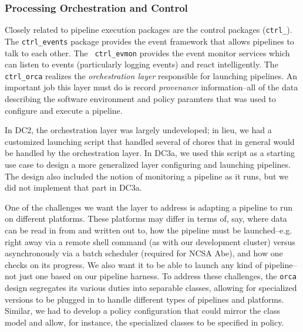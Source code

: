 
\subsubsection{Processing Orchestration and Control}

Closely related to pipeline execution packages are the control
packages ({\tt ctrl\_}).  The {\tt ctrl\_events} package provides the
event framework that allows pipelines to talk to each other.  The {\tt
ctrl\_evmon} provides the event monitor services which can listen to
events (particularly logging events) and react intelligently.  The
{\tt ctrl\_orca} realizes the {\it orchestration layer} responsible
for launching pipelines.  An important job this layer must do is
record {\it provenance} information--all of the data describing the
software environment and policy paramters that was used to configure
and execute a pipeline.  

\label{sec:PipelineOrchestration}

In DC2, the orchestration layer was largely undeveloped; in lieu, we
had a customized launching script that handled several of chores that
in general would be handled by the orchestration layer.  In DC3a, we
used this script as a starting use case to design a more generalized
layer configuring and launching pipelines.  The design also included
the notion of monitoring a pipeline as it runs, but we did not
implement that part in DC3a.  

One of the challenges we want the layer to address is adapting a
pipeline to run on different platforms.  These platforms may differ in
terms of, say, where data can be read in from and written out to, how
the pipeline must be launched--e.g. right away via a remote shell
command (as with our development cluster) versus asynchronously via a
batch scheduler (required for NCSA Abe), and how one checks on its
progress.  We also want it to be able to launch any kind of
pipeline--not just one based on our pipeline harness.  To address
these challenges, the {\tt orca} design segregates its various duties
into separable classes, allowing for specialized versions to be
plugged in to handle different types of pipelines and platforms.
Similar, we had to develop a policy configuration that could mirror
the class model and allow, for instance, the specialized classes to be
specified in policy.  

